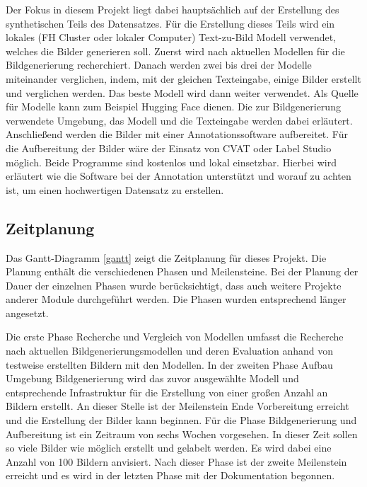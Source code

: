 Der Fokus in diesem Projekt liegt dabei hauptsächlich auf der Erstellung des synthetischen Teils des Datensatzes. Für die Erstellung dieses Teils wird ein lokales (FH Cluster oder lokaler Computer) Text-zu-Bild Modell verwendet, welches die Bilder generieren soll. Zuerst wird nach aktuellen Modellen für die Bildgenerierung recherchiert. Danach werden zwei bis drei der Modelle miteinander verglichen, indem, mit der gleichen Texteingabe, einige Bilder erstellt und verglichen werden. Das beste Modell wird dann weiter verwendet. Als Quelle für Modelle kann zum Beispiel Hugging Face \cite{huggingface2025} dienen. Die zur Bildgenerierung verwendete Umgebung, das Modell und die Texteingabe werden dabei erläutert. Anschlie{\ss}end werden die Bilder mit einer Annotationssoftware aufbereitet. Für die Aufbereitung der Bilder wäre der Einsatz von CVAT \cite{cvat2025} oder Label Studio \cite{labelimg2025} möglich. Beide Programme sind kostenlos und lokal einsetzbar. Hierbei wird erläutert wie die Software bei der Annotation unterstützt und worauf zu achten ist, um einen hochwertigen Datensatz zu erstellen.

\subsection{Zeitplanung}
Das Gantt-Diagramm \ref{gantt} zeigt die Zeitplanung für dieses Projekt. Die Planung enthält die verschiedenen Phasen und Meilensteine. Bei der Planung der Dauer der einzelnen Phasen wurde berücksichtigt, dass auch weitere Projekte anderer Module durchgeführt werden. Die Phasen wurden entsprechend länger angesetzt.
	
	Die erste Phase Recherche und Vergleich von Modellen umfasst die Recherche nach aktuellen Bildgenerierungsmodellen und deren Evaluation anhand von testweise erstellten Bildern mit den Modellen. In der zweiten Phase Aufbau Umgebung Bildgenerierung wird das zuvor ausgewählte Modell und entsprechende Infrastruktur für die Erstellung von einer gro{\ss}en Anzahl an Bildern erstellt. An dieser Stelle ist der Meilenstein Ende Vorbereitung erreicht und die Erstellung der Bilder kann beginnen. Für die Phase Bildgenerierung und Aufbereitung ist ein Zeitraum von sechs Wochen vorgesehen. In dieser Zeit sollen so viele Bilder wie möglich erstellt und gelabelt werden. Es wird dabei eine Anzahl von 100 Bildern anvisiert. Nach dieser Phase ist der zweite Meilenstein erreicht und es wird in der letzten Phase mit der Dokumentation begonnen.
	
